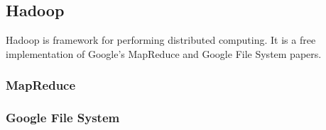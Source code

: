 \subsection{Hadoop}
Hadoop is framework for performing distributed computing. It is a free implementation of Google's MapReduce and Google File System papers. \cite{mapreduce}

\subsubsection{MapReduce}


\subsubsection{Google File System}


